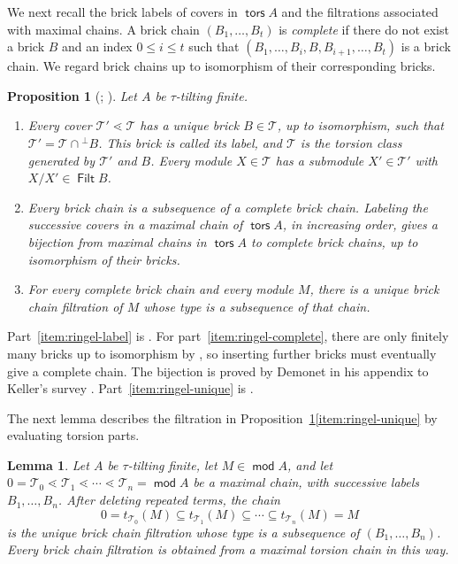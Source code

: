 \documentclass[a4paper,reqno,10pt]{amsart}
\newtheorem{proposition}[theorem]{Proposition}
\newtheorem{lemma}[theorem]{Lemma}
\theoremstyle{definition}
\numberwithin{equation}{section}
\DeclareMathOperator{\tors}{\mathsf{tors}}
\DeclareMathOperator{\modu}{\mathsf{mod}}
\newcommand{\T}{\mathcal T}
\DeclareMathOperator{\Filt}{\mathsf{Filt}}
\begin{document}
We next recall the brick labels of covers in $\tors A$ and the
filtrations associated with maximal chains. A brick chain
$(B_1,\ldots,B_t)$ is \emph{complete} if there do not exist a brick
$B$ and an index $0\leq i\leq t$ such that
$(B_1,\ldots,B_i,B,B_{i+1},\ldots,B_t)$ is a brick chain.
We regard brick chains up to isomorphism of their corresponding bricks.

\begin{proposition}[{\cite[Theorems~2.7 and~11.2]{RingelFiltrations};
\cite[Theorem~A.3]{Keller}}]\label{prop:ringel-chains}
Let $A$ be $\tau$-tilting finite.
\begin{enumerate}
\item\label{item:ringel-label}
Every cover $\T'\lessdot\T$ has a unique brick $B\in\T$, up to
isomorphism, such that $\T'=\T\cap{}^\perp B$. This brick is called
its \emph{label}, and $\T$ is the torsion class generated by $\T'$ and $B$.
Every module $X\in\T$ has a submodule $X'\in\T'$ with
$X/X'\in\Filt B$.
\item\label{item:ringel-complete}
Every brick chain is a subsequence of a complete brick chain. Labeling
the successive covers in a maximal chain of $\tors A$, in increasing
order, gives a bijection from maximal chains in $\tors A$ to complete brick
chains, up to isomorphism of their bricks.
\item\label{item:ringel-unique}
For every complete brick chain and every module $M$, there is a unique
brick chain filtration of $M$ whose type is a subsequence of that chain.
\end{enumerate}
\end{proposition}

Part~\ref{item:ringel-label} is \cite[Theorem~2.7]{RingelFiltrations}.
For part~\ref{item:ringel-complete}, there are only finitely many bricks
up to isomorphism by \cite[Theorem~4.2]{DIJ}, so inserting further bricks
must eventually give a complete chain. The bijection is proved by Demonet
in his appendix to Keller's survey \cite[Theorem~A.3]{Keller}.
Part~\ref{item:ringel-unique} is \cite[Theorem~11.2]{RingelFiltrations}.

The next lemma describes the filtration in
Proposition~\ref{prop:ringel-chains}\ref{item:ringel-unique}
by evaluating torsion parts.

\begin{lemma}\label{lem:evaluate-chain}
Let $A$ be $\tau$-tilting finite, let $M\in\modu A$, and let
$0=\T_0\lessdot\T_1\lessdot\cdots\lessdot\T_n=\modu A$ be a
maximal chain, with successive labels $B_1,\ldots,B_n$. After deleting
repeated terms, the chain
\[
 0=t_{\T_0}(M)\subseteq t_{\T_1}(M)\subseteq\cdots
   \subseteq t_{\T_n}(M)=M
\]
is the unique brick chain filtration whose type is a subsequence of
$(B_1,\ldots,B_n)$. Every brick chain filtration is obtained from a
maximal torsion chain in this way.
\end{lemma}
\end{document}
